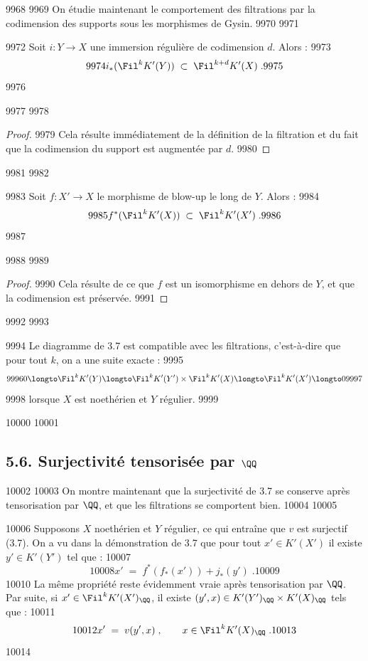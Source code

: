   9968	
  9969	On étudie maintenant le comportement des filtrations par la codimension des supports sous les morphismes de Gysin.
  9970	
  9971	\begin{proposition}[5.3]%
  9972	Soit $i : Y \to X$ une immersion régulière de codimension $d$. Alors :
  9973	\[
  9974	i_*(\Fil^k K'(Y)) \; \subset \; \Fil^{k+d} K'(X)\; .
  9975	\]
  9976	\end{proposition}
  9977	
  9978	\begin{proof}
  9979	Cela résulte immédiatement de la définition de la filtration et du fait que la codimension du support est augmentée par $d$.
  9980	\end{proof}
  9981	
  9982	\begin{proposition}[5.4]%
  9983	Soit $f : X' \to X$ le morphisme de blow-up le long de $Y$. Alors :
  9984	\[
  9985	f^*(\Fil^k K'(X)) \; \subset \; \Fil^k K'(X')\; .
  9986	\]
  9987	\end{proposition}
  9988	
  9989	\begin{proof}
  9990	Cela résulte de ce que $f$ est un isomorphisme en dehors de $Y$, et que la codimension est préservée.
  9991	\end{proof}
  9992	
  9993	\begin{proposition}[5.5]%
  9994	Le diagramme de 3.7 est compatible avec les filtrations, c'est-à-dire que pour tout $k$, on a une suite exacte :
  9995	\[
  9996	0 \longto \Fil^k K'(Y) \longto \Fil^k K'(Y') \times \Fil^k K'(X) \longto \Fil^k K'(X') \longto 0
  9997	\]
  9998	lorsque $X$ est noethérien et $Y$ régulier.
  9999	\end{proposition}
 10000	
 10001	\subsection*{5.6. Surjectivité tensorisée par $\QQ$}
 10002	
 10003	On montre maintenant que la surjectivité de 3.7 se conserve après tensorisation par $\QQ$, et que les filtrations se comportent bien.
 10004	
 10005	\begin{proposition}[5.6]%
 10006	Supposons $X$ noethérien et $Y$ régulier, ce qui entraîne que $v$ est surjectif (3.7). On a vu dans la démonstration de 3.7 que pour tout $x' \in K'(X')$ il existe $y' \in K'(Y')$ tel que :
 10007	\[
 10008	x' \; = \; f^*(f_*(x')) + j_*(y')\; .
 10009	\]
 10010	La même propriété reste évidemment vraie après tensorisation par $\QQ$. Par suite, si $x' \in \Fil^k K'(X')_{\QQ}$, il existe $(y', x) \in K'(Y')_{\QQ} \times K'(X)_{\QQ}$ tels que :
 10011	\[
 10012	x' \; = \; v(y',x)\; , \qquad x \in \Fil^k K'(X)_{\QQ}\; .
 10013	\]
 10014	\end{proposition}

